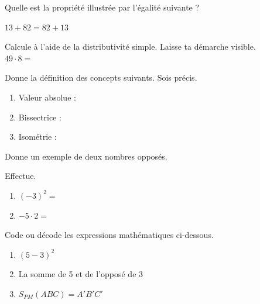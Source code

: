 \documentclass[parskip=half-,DIV=12,twoside=semi, 12pt]{scrartcl}
\newcounter{l}
\begin{document}
\begin{connaitre}[points=1]
    Quelle est la propriété illustrée par l'égalité suivante ?

    \hfil \(13+82 = 82 + 13\) \hfil {}
\end{connaitre}
\begin{connaitre}[points=1]
    Calcule à l'aide de la distributivité simple. Laisse ta démarche visible. \\
    
    \(49 \cdot 8 =\)
    \vspace{3cm}
\end{connaitre}
\begin{connaitre}[points=3]
    Donne la définition des concepts suivants. Sois précis.
    \begin{enumerate}[itemsep=2cm, after=\vspace*{2cm}]
        \item Valeur absolue :
        \item Bissectrice :
        \item Isométrie :
    \end{enumerate}
\end{connaitre}
\begin{connaitre}[points=1]
    Donne un exemple de deux nombres opposés.
    \vspace*{2cm}
\end{connaitre}
\begin{appliquer}[points=2]
    Effectue.
    \begin{enumerate}[cols=2]
        \item \((-3)^2 =\)
        \item \(-5 \cdot 2 = \)
    \end{enumerate}
\end{appliquer}
\newpage
\begin{connaitre}[points=3]
    Code ou décode les expressions mathématiques ci-dessous.
    \begin{enumerate}[itemsep=1.5cm, after=\vspace*{1cm}]
        \item \((5-3)^2\)
        \item La somme de 5 et de l'opposé de 3
        \item \(S_{PM}(ABC) = A'B'C'\) \vspace*{2cm}
    \end{enumerate}
\end{connaitre}
\end{document}
